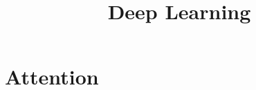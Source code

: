 





\newcommand{\titlefigure}{plots/attention3.png}
\newcommand{\learninggoals}{
  \item Attention
  \item Transformers
  \item RNN vs CNN
}

\title{Deep Learning}
\date{}







\section{Attention}

